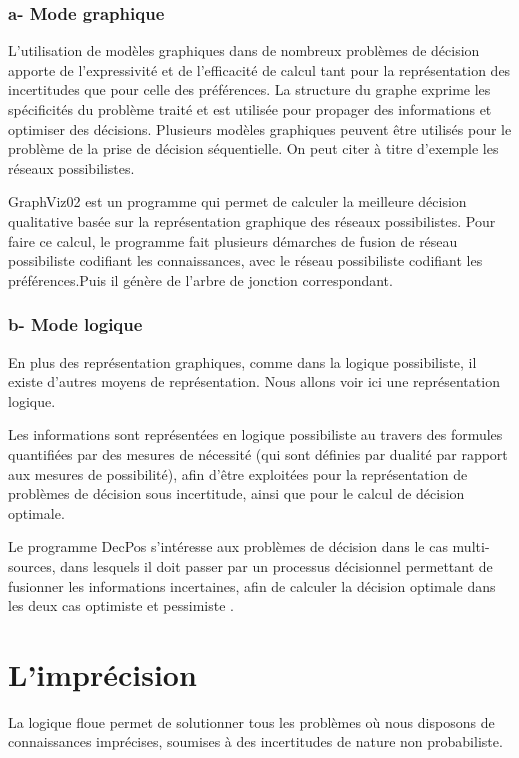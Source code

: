 \subsubsection{a- Mode graphique}
L’utilisation de modèles graphiques dans de nombreux problèmes de décision apporte de
l’expressivité et de l’efficacité de calcul tant pour la représentation des incertitudes que pour celle
des préférences. La structure du graphe exprime les spécificités du problème traité et est utilisée
pour propager des informations et optimiser des décisions. Plusieurs modèles graphiques peuvent
être utilisés pour le problème de la prise de décision séquentielle. On peut citer à titre d’exemple les réseaux possibilistes.

GraphViz02 est un programme qui permet de calculer la meilleure décision qualitative basée sur la représentation graphique des réseaux possibilistes. Pour faire ce calcul, le programme fait plusieurs démarches de fusion de réseau possibiliste codifiant les connaissances, avec le réseau possibiliste codifiant les préférences.Puis il génère de l’arbre de jonction correspondant\cite{hkhaoulaThesis}.
\subsubsection{b- Mode logique}
En plus des représentation graphiques, comme dans la logique possibiliste, il existe d’autres moyens de
représentation. Nous allons voir ici une représentation logique.

Les informations sont représentées en logique possibiliste au travers des formules quantifiées par des mesures de nécessité (qui sont définies par dualité par rapport aux mesures de possibilité), afin d'être exploitées pour la représentation de problèmes de décision sous incertitude, ainsi que pour le calcul de décision optimale.

Le programme DecPos s'intéresse aux problèmes de décision dans le cas multi-sources, dans lesquels il doit passer par un processus décisionnel permettant de fusionner les informations incertaines, afin de calculer la décision optimale dans les deux cas optimiste et pessimiste \cite{Noughithese}.

\section{L’imprécision}

La logique floue permet de solutionner tous les problèmes où nous disposons de connaissances imprécises, soumises à des incertitudes de nature non probabiliste.

